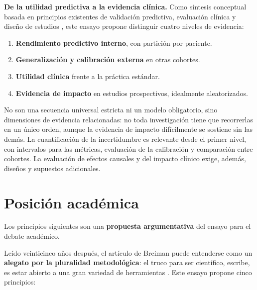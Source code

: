 \documentclass[11pt,a4paper]{article}
\providecommand{\tightlist}{\setlength{\itemsep}{0pt}\setlength{\parskip}{0pt}}
\begin{document}
\textbf{De la utilidad predictiva a la evidencia clínica.} Como síntesis conceptual basada en principios existentes de validación predictiva, evaluación clínica y diseño de estudios \autocite{collins2024,liu2020}, este ensayo propone distinguir cuatro niveles de evidencia:

\begin{enumerate}
\def\labelenumi{\arabic{enumi}.}
\tightlist
\item
  \textbf{Rendimiento predictivo interno}, con partición por paciente.
\item
  \textbf{Generalización y calibración externa} en otras cohortes.
\item
  \textbf{Utilidad clínica} frente a la práctica estándar.
\item
  \textbf{Evidencia de impacto} en estudios prospectivos, idealmente aleatorizados.
\end{enumerate}

No son una secuencia universal estricta ni un modelo obligatorio, sino dimensiones de evidencia relacionadas: no toda investigación tiene que recorrerlas en un único orden, aunque la evidencia de impacto difícilmente se sostiene sin las demás. La cuantificación de la incertidumbre es relevante desde el primer nivel, con intervalos para las métricas, evaluación de la calibración y comparación entre cohortes. La evaluación de efectos causales y del impacto clínico exige, además, diseños y supuestos adicionales.

\section{Posición académica}\label{sec-posicion}

\begin{recuadro}
Los principios siguientes son una \textbf{propuesta argumentativa} del ensayo para el debate académico.
\end{recuadro}

Leído veinticinco años después, el artículo de Breiman puede entenderse como un \textbf{alegato por la pluralidad metodológica}: el truco para ser científico, escribe, es estar abierto a una gran variedad de herramientas \autocite[214]{breiman2001}. Este ensayo propone cinco principios:
\end{document}
